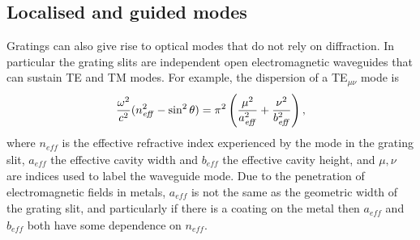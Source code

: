 \subsection{Localised and guided modes}
\label{sec:channel}
Gratings can also give rise to optical modes that do not rely on diffraction. In particular the grating slits are independent open electromagnetic waveguides that can sustain TE and TM modes. For example, the dispersion of a TE$_{\mu\nu}$ mode is \cite{Jackson1999}
\begin{equation}
\centering
\frac{\omega^2}{c^2}(n_{\mathit{eff}}^2-\sin^2\theta) = \pi^2\left(\frac{\mu^2}{a_{\mathit{eff}}^2}+\frac{\nu^2}{b_{\mathit{eff}}^2}\right) ,
\label{waveguide}
\end{equation}
where $n_{\mathit{eff}}$ is the effective refractive index experienced by the mode in the grating slit, $a_{\mathit{eff}}$ the effective cavity width and $b_{\mathit{eff}}$ the effective cavity height, and $\mu, \nu$ are indices used to label the waveguide mode. Due to the penetration of electromagnetic fields in metals, $a_{\mathit{eff}}$ is not the same as the geometric width of the grating slit, and particularly if there is a coating on the metal then $a_{\mathit{eff}}$ and $b_{\mathit{eff}}$ both have some dependence on $n_{\mathit{eff}}$. 

